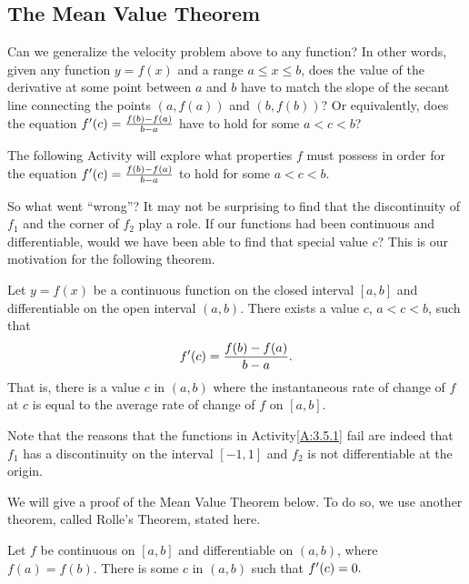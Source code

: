 
\subsection*{The Mean Value Theorem}

Can we generalize the velocity problem above to any function? In other words, given any function $y=f(x)$ and a range $a\leq x \leq b$, does the value of the derivative at some point between $a$ and $b$ have to match the slope of the secant line connecting the points $(a,f(a))$ and $(b,f(b))$?  Or equivalently, does the equation 
$f'(c) = \frac{f(b)-f(a)}{b-a}$ have to hold for some $a < c < b$?

The following Activity will explore what properties $f$ must possess in order for the equation 
$f'(c) = \frac{f(b)-f(a)}{b-a}$ to hold for some $a < c < b$.


So what went ``wrong''?  It may not be surprising to find that the discontinuity of $f_1$ and the corner of $f_2$ play a role.  If our functions had been continuous and differentiable, would we have been able to find that special value $c$? This is our motivation for the following theorem.

{Let $y=f(x)$ be a continuous function on the closed interval $[a,b]$ and differentiable on the open interval $(a,b)$. There exists a value $c$, $a < c < b$, such that 
$$
f'(c) = \frac{f(b)-f(a)}{b-a}.
$$
That is, there is a value $c$ in $(a,b)$ where the instantaneous rate of change of $f$ at $c$ is equal to the average rate of change of $f$ on $[a,b]$.} %

Note that the reasons that the functions in Activity\ref{A:3.5.1} fail are indeed that $f_1$ has a discontinuity on the interval $[-1,1]$ and $f_2$ is not differentiable at the origin.

We will give a proof of the Mean Value Theorem below. To do so, we use another theorem, called Rolle's Theorem, stated here.

{Let $f$ be continuous on $[a,b]$ and differentiable on $(a,b)$, where $f(a) = f(b)$. There is some $c$ in $(a,b)$ such that $f'(c) = 0.$} %

